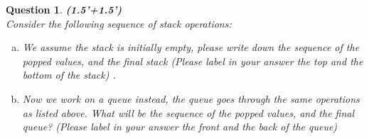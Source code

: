 \documentclass[10.5pt]{article}
\newtheorem{Q}{Question}
\begin{document}
\begin{Q}
\textbf{(1.5'+1.5')}\\Consider the following sequence of stack operations: 
\begin{enumerate}[(a)]
	\item We assume the stack is initially empty,  please write down the sequence of the popped values, and the final stack (Please label in your answer the top and the bottom of the stack) .
	\item Now we work on a queue instead, the queue goes through the same operations as listed above. What will be the sequence of the popped values, and the final queue? (Please label in your answer the front and the back of the queue)
\end{enumerate}
\vspace{2.5in}
\end{Q}
\end{document}
